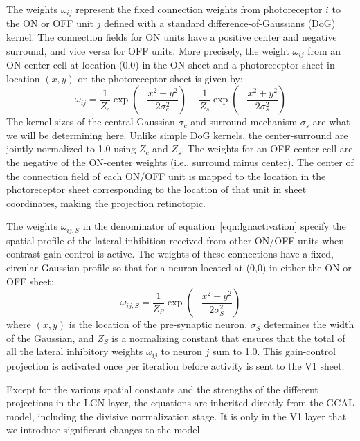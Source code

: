 The weights $\omega_{ij}$ represent the fixed connection weights from
photoreceptor $i$ to the ON or OFF unit $j$ defined with a standard
difference-of-Gaussians (DoG) kernel. The connection fields for ON units
have a positive center and negative surround, and vice versa for OFF
units. More precisely, the weight $\omega_{ij}$ from an ON-center cell
at location (0,0) in the ON sheet and a photoreceptor sheet in
location $(x,y)$ on the photoreceptor sheet is given by:
\begin{equation}
\omega_{ij}=\frac{1}{Z_c}\exp{\left(-\frac{x^{2}+y^{2}}{2\sigma_{c}^{2}}\right)}-\frac{1}{Z_s}\exp\left(-\frac{x^{2}+y^{2}}{2\sigma_{s}^{2}}\right)
\label{eqn:DoG}
\end{equation}
The kernel sizes of the central Gaussian $\sigma_{c}$ and surround
mechanism $\sigma_{s}$ are what we will be determining here. Unlike
simple DoG kernels, the center-surround are jointly normalized to 1.0
using $Z_c$ and $Z_s$. The weights for an OFF-center cell are the
negative of the ON-center weights (i.e., surround minus center). The
center of the connection field of each ON/OFF unit is mapped to the
location in the photoreceptor sheet corresponding to the location of
that unit in sheet coordinates, making the projection retinotopic.

The weights $\omega_{ij, S}$ in the denominator of
equation~\ref{eqn:lgnactivation} specify the spatial profile of the
lateral inhibition received from other ON/OFF units when contrast-gain
control is active. The weights of these connections have a fixed,
circular Gaussian profile so that for a neuron located at (0,0) in
either the ON or OFF sheet:
\begin{equation}
\omega_{ij,S}=\frac{1}{Z_S}\exp\left(-\frac{x^{2}+y^{2}}{2\sigma_{S}^{2}}\right)
\label{eqn:gauss}
\end{equation}
where $(x, y)$ is the location of the pre-synaptic neuron, $\sigma_{S}$
determines the width of the Gaussian, and $Z_S$ is a normalizing
constant that ensures that the total of all the lateral inhibitory
weights $\omega_{ij}$ to neuron $j$ sum to 1.0. This gain-control
projection is activated once per iteration before activity is sent to
the V1 sheet.

Except for the various spatial constants and the strengths of the
different projections in the LGN layer, the equations are inherited
directly from the GCAL model, including the divisive normalization
stage. It is only in the V1 layer that we introduce significant
changes to the model.

